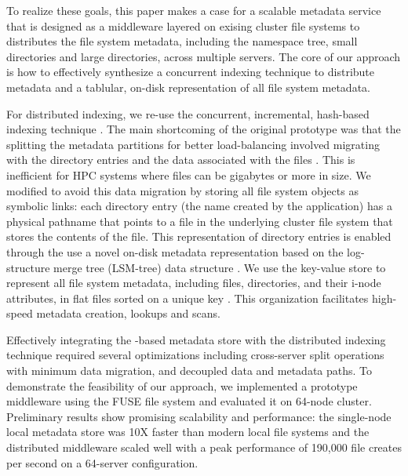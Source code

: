 To realize these goals, this paper makes a case for a scalable metadata service 
that is designed as a middleware layered on exising cluster file systems to 
distributes the file system metadata, including the namespace tree, small 
directories and large directories, across multiple servers.
The core of our approach is how to effectively synthesize a concurrent indexing 
technique to distribute metadata and a tablular, on-disk representation of all
file system metadata. 

For distributed indexing, we re-use the concurrent, incremental, hash-based
\giga{} indexing technique \citep{giga}.
The main shortcoming of the original \giga{} prototype was that the splitting
the metadata partitions for better load-balancing involved migrating with the
directory entries and the data associated with the files \citep{giga}.
This is inefficient for HPC systems where files can be gigabytes or more in
size. We modified \giga{} to avoid this data migration by storing all file
system objects as symbolic links: each directory entry (the name created by the
application) has a physical pathname that points to a file in the underlying
cluster file system that stores the contents of the file.
This representation of directory entries is enabled through the use a novel
on-disk metadata representation based on the log-structure merge tree (LSM-tree)
data structure \citep{ONeil1996}.
We use the \ldb{} key-value store to represent all file system metadata, including 
files, directories, and their i-node attributes, in flat files sorted on a
unique key \citep{LevelDB}.
This organization facilitates high-speed metadata creation, lookups and scans.

Effectively integrating the \ldb-based metadata store with the distributed indexing
technique required several optimizations including cross-server split operations 
with minimum data migration, and decoupled data and metadata paths.
To demonstrate the feasibility of our approach, we implemented a prototype middleware
using the FUSE file system and evaluated it on 64-node cluster. Preliminary
results show promising scalability and performance: the single-node local metadata 
store was 10X faster than modern local file systems and the distributed
middleware scaled well with a peak performance of 190,000 file creates per second 
on a 64-server configuration. 


